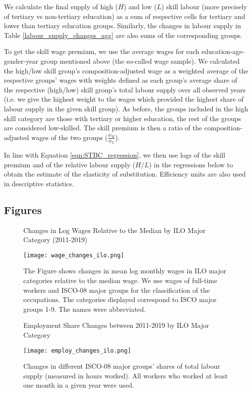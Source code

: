 \documentclass[11pt]{article}
\begin{document}
We calculate the final supply of high ($H$) and low ($L$) skill labour (more precisely of tertiary vs non-tertiary education) as a sum of respective cells for tertiary and lower than tertiary education groups. Similarly, the changes in labour supply in Table \ref{labour_supply_changes_agg} are also sums of the corresponding groups.

To get the skill wage premium, we use the average wages for each education-age-gender-year group mentioned above (the so-called wage sample). We calculated the high/low skill group's composition-adjusted wage as a weighted average of the respective groups' wages with weights defined as each group's average share of the respective (high/low) skill group's total labour supply over all observed years (i.e. we give the highest weight to the wages which provided the highest share of labour supply in the given skill group). As before, the groups included in the high skill category are those with tertiary or higher education, the rest of the groups are considered low-skilled. The skill premium is then a ratio of the composition-adjusted wages of the two groups ($\frac{w_H}{w_L}$).


In line with Equation \ref{eqn:STBC_regression}, we then use logs of the skill premium and of the relative labour supply ($H/L$) in the regressions below to obtain the estimate of the elasticity of substitution. Efficiency units are also used in descriptive statistics.



\subsection{Figures}

\begin{figure}[!htbp]%
\centering
    \caption{Changes in Log Wages Relative to the Median by ILO Major Category (2011-2019)}
    {\texttt{[image: wage\_changes\_ilo.png]} }
    \caption*{\footnotesize The Figure shows changes in mean log monthly wages in ILO major categories relative to the median wage. We use wages of full-time workers and ISCO-08 major groups for the classification of the occupations. The categories displayed correspond to ISCO major groups 1-9. The names were abbreviated.}
\label{wage_changes_ilo}
\end{figure}


\begin{figure}[!htbp]%
\centering
    \caption{Employment Share Changes between 2011-2019 by ILO Major Category}
    {\texttt{[image: employ\_changes\_ilo.png]} }
    \caption*{\footnotesize Changes in different ISCO-08 major groups' shares of total labour supply (measured in hours worked). All workers who worked at least one month in a given year were used.}
\label{employ_changes_ilo}
\end{figure}
\end{document}
